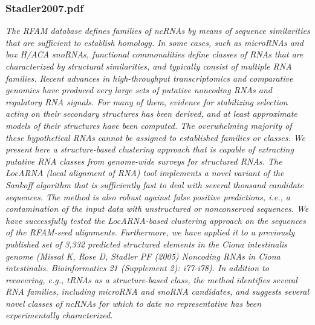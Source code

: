 \documentclass[graybox]{svmult}
\begin{document}
\subsubsection{Stadler2007.pdf}
\cite{Will2007}
\textit{The RFAM database defines families of ncRNAs by means of sequence similarities that are sufficient to establish homology. In some cases, such as microRNAs and box H/ACA snoRNAs, functional commonalities define classes of RNAs that are characterized by structural similarities, and typically consist of multiple RNA families. Recent advances in high-throughput transcriptomics and comparative genomics have produced very large sets of putative noncoding RNAs and regulatory RNA signals. For many of them, evidence for stabilizing selection acting on their secondary structures has been derived, and at least approximate models of their structures have been computed. The overwhelming majority of these hypothetical RNAs cannot be assigned to established families or classes. We present here a structure-based clustering approach that is capable of extracting putative RNA classes from genome-wide surveys for structured RNAs. The LocARNA (local alignment of RNA) tool implements a novel variant of the Sankoff algorithm that is sufficiently fast to deal with several thousand candidate sequences. The method is also robust against false positive predictions, i.e., a contamination of the input data with unstructured or nonconserved sequences. We have successfully tested the LocARNA-based clustering approach on the sequences of the RFAM-seed alignments. Furthermore, we have applied it to a previously published set of 3,332 predicted structured elements in the Ciona intestinalis genome (Missal K, Rose D, Stadler PF (2005) Noncoding RNAs in Ciona intestinalis. Bioinformatics 21 (Supplement 2): i77-i78). In addition to recovering, e.g., tRNAs as a structure-based class, the method identifies several RNA families, including microRNA and snoRNA candidates, and suggests several novel classes of ncRNAs for which to date no representative has been experimentally characterized.}
\end{document}
